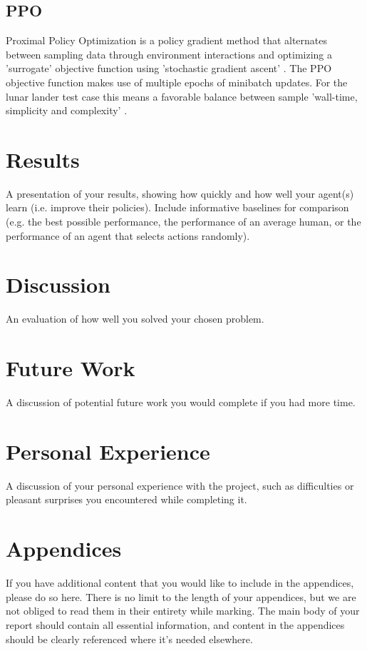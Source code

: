 \documentclass{article}
\begin{document}
\subsection{PPO}

Proximal Policy Optimization is a policy gradient method that alternates between sampling data
through environment interactions and optimizing a ’surrogate’ objective function using ’stochastic
gradient ascent’ \citep{schulman2017proximal}. The PPO objective function makes use of multiple epochs
of minibatch updates. For the lunar lander test case this means a favorable balance between sample
’wall-time, simplicity and complexity’ \citep{schulman2017proximal}.

\section{Results}
A presentation of your results, showing how quickly and how well your agent(s)
learn (i.e. improve their policies). Include informative baselines for comparison (e.g. the best
possible performance, the performance of an average human, or the performance of an agent
that selects actions randomly).

\section{Discussion}
An evaluation of how well you solved your chosen problem.

\section{Future Work}
A discussion of potential future work you would complete if you had more
time.

\section{Personal Experience}
A discussion of your personal experience with the project, such as
difficulties or pleasant surprises you encountered while completing it.




\newpage
\section*{Appendices}
If you have additional content that you would like to include in the appendices, please do so here.
There is no limit to the length of your appendices, but we are not obliged to read them in their entirety while marking. The main body of your report should contain all essential information, and content in the appendices should be clearly referenced where it's needed elsewhere.
\end{document}
